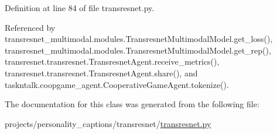 Definition at line 84 of file transresnet.\+py.



Referenced by transresnet\+\_\+multimodal.\+modules.\+Transresnet\+Multimodal\+Model.\+get\+\_\+loss(), transresnet\+\_\+multimodal.\+modules.\+Transresnet\+Multimodal\+Model.\+get\+\_\+rep(), transresnet.\+transresnet.\+Transresnet\+Agent.\+receive\+\_\+metrics(), transresnet.\+transresnet.\+Transresnet\+Agent.\+share(), and taskntalk.\+coopgame\+\_\+agent.\+Cooperative\+Game\+Agent.\+tokenize().



The documentation for this class was generated from the following file\+:\begin{DoxyCompactItemize}
\item 
projects/personality\+\_\+captions/transresnet/\hyperlink{projects_2personality__captions_2transresnet_2transresnet_8py}{transresnet.\+py}\end{DoxyCompactItemize}
